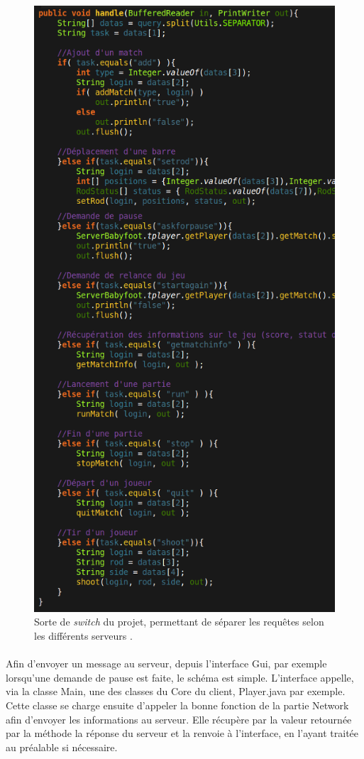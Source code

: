 \documentclass[a4paper,12pt]{report}
\begin{document}
\begin{figure}[H]
	\begin{center}
	\includegraphics[width=12cm]{pictures/switch.png} 
	\end{center}
	\caption{Sorte de \emph{switch} du projet, permettant de séparer les requêtes selon les différents \og serveurs \fg.}
    \end{figure}
\paragraph{}
Afin d'envoyer un message au serveur, depuis l'interface Gui, par exemple lorsqu'une demande de pause est faite, le schéma est simple. L'interface appelle, via la classe Main, une des classes du Core du client, Player.java par exemple. Cette classe se charge ensuite d'appeler la bonne fonction de la partie Network afin d'envoyer les informations au serveur. Elle récupère par la valeur retournée par la méthode la réponse du serveur et la renvoie à l'interface, en l'ayant traitée au préalable si nécessaire.
\end{document}
